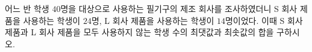 어느 반 학생 $40$명을 대상으로 사용하는 필기구의 제조 회사를 조사하였더니 S 회사 제품을 사용하는 학생이 $24$명, L 회사 제품을 사용하는 학생이 $14$명이었다. 이때 S 회사 제품과 L 회사 제품을 모두 사용하지 않는 학생 수의 최댓값과 최솟값의 합을 구하시오.
